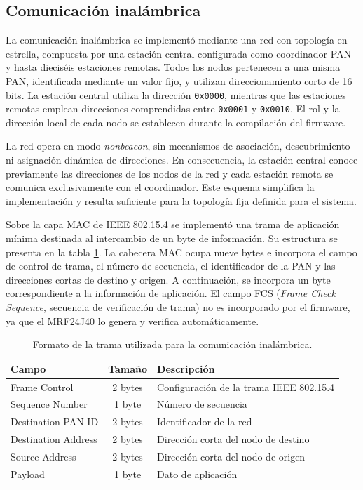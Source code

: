 \subsection{Comunicación inalámbrica}

La comunicación inalámbrica se implementó mediante una red con topología en estrella, compuesta por una estación central configurada como coordinador PAN y hasta dieciséis estaciones remotas. Todos los nodos pertenecen a una misma PAN, identificada mediante un valor fijo, y utilizan direccionamiento corto de 16 bits. La estación central utiliza la dirección \texttt{0x0000}, mientras que las estaciones remotas emplean direcciones comprendidas entre \texttt{0x0001} y \texttt{0x0010}. El rol y la dirección local de cada nodo se establecen durante la compilación del firmware.

La red opera en modo \textit{nonbeacon}, sin mecanismos de asociación, descubrimiento ni asignación dinámica de direcciones. En consecuencia, la estación central conoce previamente las direcciones de los nodos de la red y cada estación remota se comunica exclusivamente con el coordinador. Este esquema simplifica la implementación y resulta suficiente para la topología fija definida para el sistema.

Sobre la capa MAC de IEEE 802.15.4 se implementó una trama de aplicación mínima destinada al intercambio de un byte de información. Su estructura se presenta en la tabla \ref{tab:radio_frame}. La cabecera MAC ocupa nueve bytes e incorpora el campo de control de trama, el número de secuencia, el identificador de la PAN y las direcciones cortas de destino y origen. A continuación, se incorpora un byte correspondiente a la información de aplicación. El campo FCS (\textit{Frame Check Sequence}, secuencia de verificación de trama) no es incorporado por el firmware, ya que el MRF24J40 lo genera y verifica automáticamente.

\begin{table}[h]
	\centering
	\caption[Formato de la trama inalámbrica]{Formato de la trama utilizada para la comunicación inalámbrica.}
	\begin{tabular}{l c l}
		\toprule
		\textbf{Campo}      & \textbf{Tamaño} & \textbf{Descripción} \\
		\midrule
		Frame Control       & 2 bytes         & Configuración de la trama IEEE 802.15.4 \\
		Sequence Number     & 1 byte          & Número de secuencia \\
		Destination PAN ID  & 2 bytes         & Identificador de la red \\
		Destination Address & 2 bytes         & Dirección corta del nodo de destino \\
		Source Address      & 2 bytes         & Dirección corta del nodo de origen \\
		Payload             & 1 byte          & Dato de aplicación \\
		\bottomrule
	\end{tabular}
	\label{tab:radio_frame}
\end{table}

